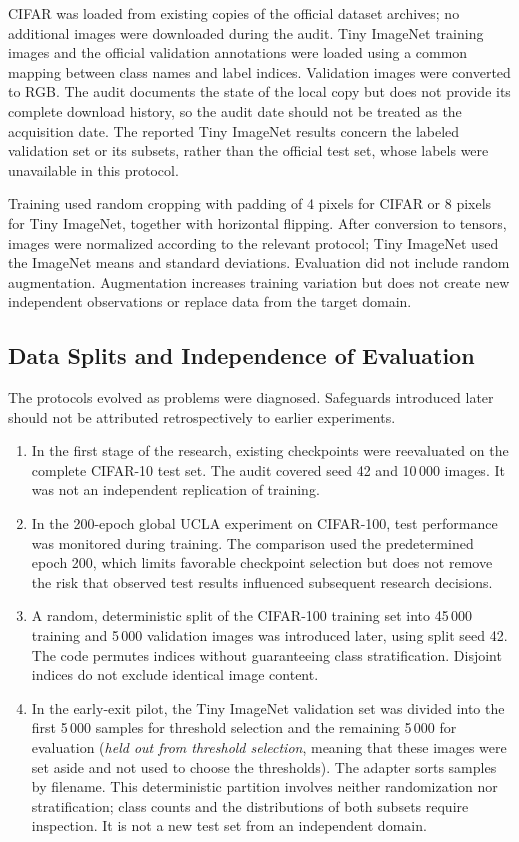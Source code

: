 \documentclass[12pt,a4paper]{article}
\begin{document}
CIFAR was loaded from existing copies of the official dataset archives;
no additional images were downloaded during the audit.
Tiny ImageNet training images and the official validation annotations
were loaded using a common mapping between class names and label indices.
Validation images were converted to RGB.
The audit documents the state of the local copy but does not provide
its complete download history, so the audit date should not be treated
as the acquisition date. The reported Tiny ImageNet results concern the
labeled validation set or its subsets, rather than the official test set,
whose labels were unavailable in this protocol.

Training used random cropping with padding of 4 pixels for CIFAR or
8 pixels for Tiny ImageNet, together with horizontal flipping.
After conversion to tensors, images were normalized according to the
relevant protocol; Tiny ImageNet used the ImageNet means and standard
deviations. Evaluation did not include random augmentation.
Augmentation increases training variation but does not create new
independent observations or replace data from the target domain.

\subsection{Data Splits and Independence of Evaluation}

The protocols evolved as problems were diagnosed. Safeguards introduced
later should not be attributed retrospectively to earlier experiments.
\begin{enumerate}
\item In the first stage of the research, existing checkpoints were reevaluated on
the complete CIFAR-10 test set. The audit covered seed 42 and 10\,000
images. It was not an independent replication of training.
\item In the 200-epoch global UCLA experiment on CIFAR-100, test performance
was monitored during training. The comparison used the predetermined
epoch 200, which limits favorable checkpoint selection but does not remove
the risk that observed test results influenced subsequent research decisions.
\item A random, deterministic split of the CIFAR-100 training set into
45\,000 training and 5\,000 validation images was introduced later,
using split seed 42. The code permutes indices without guaranteeing
class stratification. Disjoint indices do not exclude identical image content.
\item In the early-exit pilot, the Tiny ImageNet validation set was divided
into the first 5\,000 samples for threshold selection and the remaining
5\,000 for evaluation (\emph{held out from threshold selection}, meaning that these images
were set aside and not used to choose the thresholds).
The adapter sorts samples by filename. This deterministic partition
involves neither randomization nor stratification; class counts and
the distributions of both subsets require inspection.
It is not a new test set from an independent domain.
\end{enumerate}
\end{document}
